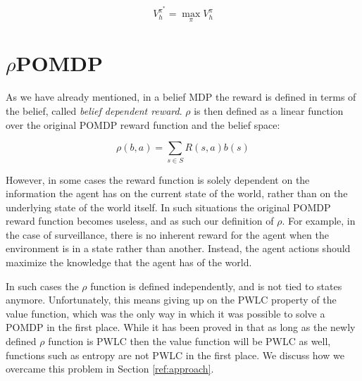 \[ V^{\pi^*}_h = \max_\pi V^{\pi}_h \]

\section{$\rho$POMDP}

As we have already mentioned, in a belief MDP the reward is defined in terms of the belief, called
\textit{belief dependent reward}. $\rho$ is then defined as a linear function over the original
POMDP reward function and the belief space:

\[ \rho(b,a) = \sum_{s\in S} R(s,a) b(s) \]

However, in some cases the reward function is solely dependent on the information the agent has on
the current state of the world, rather than on the underlying state of the world itself. In such
situations the original POMDP reward function becomes useless, and as such our definition of $\rho$.
For example, in the case of surveillance, there is no inherent reward for the agent when the
environment is in a state rather than another. Instead, the agent actions should maximize the
knowledge that the agent has of the world.

In such cases the $\rho$ function is defined independently, and is not tied to states anymore.
Unfortunately, this means giving up on the PWLC property of the value function, which was the only
way in which it was possible to solve a POMDP in the first place. While it has been proved in
\cite{cit:rpomdp} that as long as the newly defined $\rho$ function is PWLC then the value function
will be PWLC as well, functions such as entropy are not PWLC in the first place. We discuss how we
overcame this problem in Section \ref{ref:approach}.
